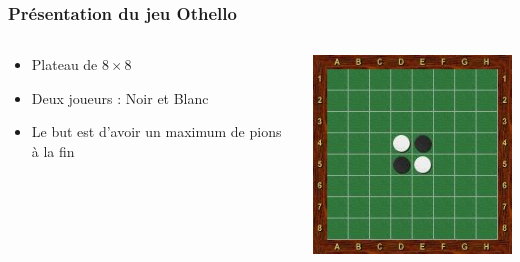 \begin{frame}
\frametitle{Présentation du jeu Othello}

\begin{columns}
    \begin{column}{0.65\textwidth}
        \begin{itemize}
            \item Plateau de $8 \times 8$
            \item Deux joueurs : Noir et Blanc
            \item Le but est d’avoir un maximum de pions à la fin
        \end{itemize}
    \end{column}
        \bigskip    
    \begin{column}{0.35\textwidth}
        \includegraphics[width=\linewidth]{img/debut-othello.jpg}
    \end{column}
\end{columns}
\end{frame}

